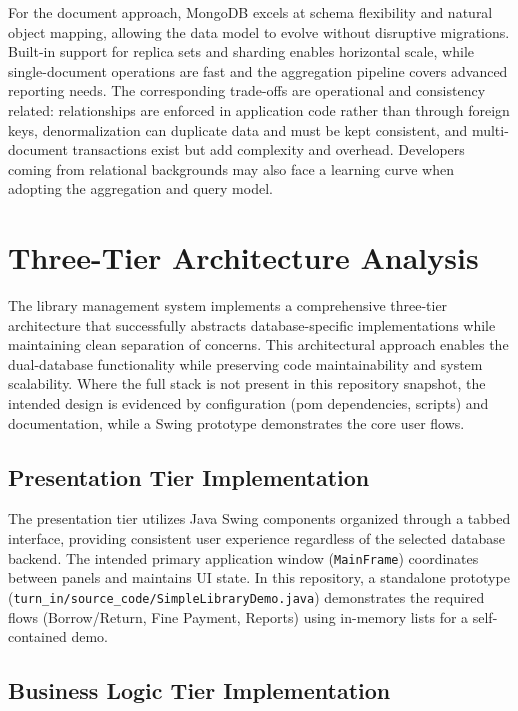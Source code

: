 \documentclass[12pt,a4paper]{article}
\newcommand{\file}[1]{\texttt{#1}}
\newcommand{\class}[1]{\texttt{#1}}
\begin{document}
For the document approach, MongoDB excels at schema flexibility and natural object mapping, allowing the data model to evolve without disruptive migrations. Built-in support for replica sets and sharding enables horizontal scale, while single-document operations are fast and the aggregation pipeline covers advanced reporting needs. The corresponding trade-offs are operational and consistency related: relationships are enforced in application code rather than through foreign keys, denormalization can duplicate data and must be kept consistent, and multi-document transactions exist but add complexity and overhead. Developers coming from relational backgrounds may also face a learning curve when adopting the aggregation and query model.

\section{Three-Tier Architecture Analysis}

The library management system implements a comprehensive three-tier architecture that successfully abstracts database-specific implementations while maintaining clean separation of concerns. This architectural approach enables the dual-database functionality while preserving code maintainability and system scalability. Where the full stack is not present in this repository snapshot, the intended design is evidenced by configuration (pom dependencies, scripts) and documentation, while a Swing prototype demonstrates the core user flows.

\subsection{Presentation Tier Implementation}

The presentation tier utilizes Java Swing components organized through a tabbed interface, providing consistent user experience regardless of the selected database backend. The intended primary application window (\class{MainFrame}) coordinates between panels and maintains UI state. In this repository, a standalone prototype (\file{turn\_in/source\_code/SimpleLibraryDemo.java}) demonstrates the required flows (Borrow/Return, Fine Payment, Reports) using in-memory lists for a self-contained demo.

\subsection{Business Logic Tier Implementation}
\end{document}
